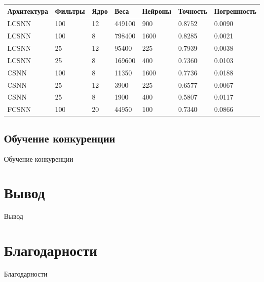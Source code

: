 \documentclass[a4paper]{article}
\begin{document}
\begin{center}
\begin{tabular}{|l|l|l|l|l|l|l|}
\hline
{Архитектура} & {Фильтры} & {Ядро} & {Веса} & {Нейроны} & {Точность} & {Погрешность}\\
\hline
{LCSNN} & {100} & {12} & {449100} & {900} & {0.8752} & {0.0090}\\
\hline
{LCSNN} & {100} & {8} & {798400} & {1600} & {0.8285} & {0.0021}\\
\hline
{LCSNN} & {25} & {12} & {95400} & {225} & {0.7939} & {0.0038}\\
\hline
{LCSNN} & {25} & {8} & {169600} & {400} & {0.7360} & {0.0103}\\
\hline
{CSNN} & {100} & {8} & {11350} & {1600} & {0.7736} & {0.0188}\\
\hline
{CSNN} & {25} & {12} & {3900} & {225} & {0.6577} & {0.0067}\\
\hline
{CSNN} & {25} & {8} & {1900} & {400} & {0.5807} & {0.0117}\\
\hline
{FCSNN} & {100} & {20} & {44950} & {100} & {0.7340} & {0.0866}\\
\hline
\end{tabular}
\end{center}


\subsection{Обучение конкуренции}
Обучение конкуренции

\section{Вывод}
 Вывод
 
\section{Благодарности}
Благодарности

\printbibliography
\end{document}
